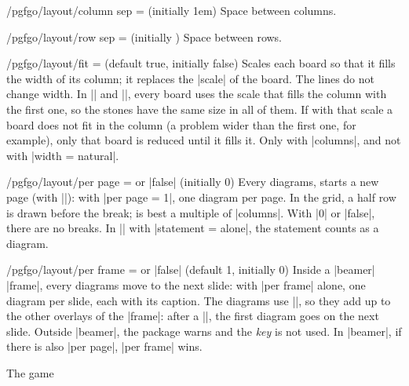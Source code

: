 \begin{key}{/pgfgo/layout/column sep =  (initially 1em)}
	Space between columns.
\end{key}

\begin{key}{/pgfgo/layout/row sep =  (initially \texttt{\string\medskipamount})}
	Space between rows.
\end{key}

\begin{key}{/pgfgo/layout/fit =  (default true, initially false)}
	Scales each board so that it fills the width of its column; it replaces the |scale| of the board. The lines do not change width. In |\sgfdiagrams| and |\sgfproblem|, every board uses the scale that fills the column with the first one, so the stones have the same size in all of them. If with that scale a board does not fit in the column (a problem wider than the first one, for example), only that board is reduced until it fills it. Only with |columns|, and not with |width = natural|.
\end{key}

\begin{key}{/pgfgo/layout/per page =  or |false| (initially 0)}
	Every  diagrams, starts a new page (with |\newpage|): with |per page = 1|, one diagram per page. In the grid, a half row is drawn before the break;  is best a multiple of |columns|. With |0| or |false|, there are no breaks. In |\sgfproblem| with |statement = alone|, the statement counts as a diagram.

	\begin{codeexample}
	\end{codeexample}
\end{key}

\begin{key}{/pgfgo/layout/per frame =  or |false| (default 1, initially 0)}
	Inside a |beamer| |frame|, every  diagrams move to the next slide: with |per frame| alone, one diagram per slide, each with its caption. The diagrams use |\only<+>|, so they add up to the other overlays of the |frame|: after a |\pause|, the first diagram goes on the next slide. Outside |beamer|, the package warns and the \emph{key} is not used. In |beamer|, if there is also |per page|, |per frame| wins.

	\begin{codeexample}
		\begin{frame}{The game}
		\end{frame}
	\end{codeexample}
\end{key}

